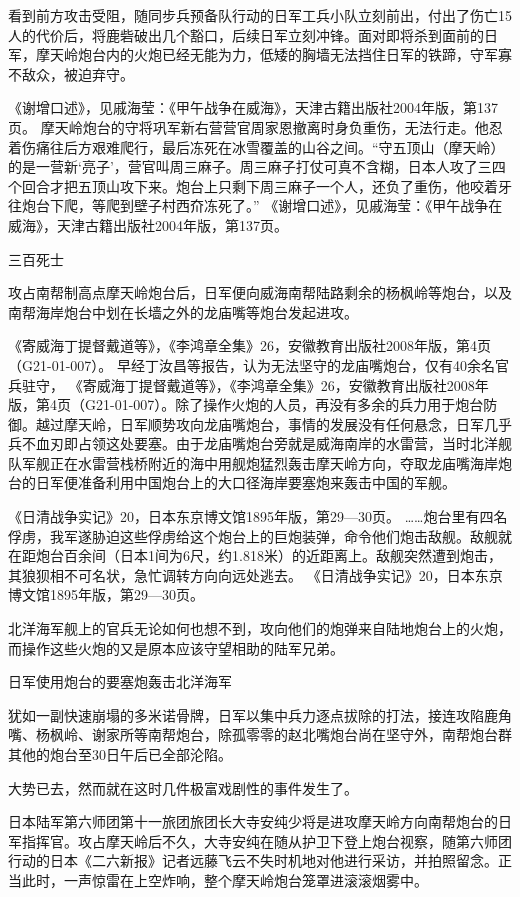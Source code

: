 \documentclass[12pt,UTF8]{ctexbook}
\begin{document}
看到前方攻击受阻，随同步兵预备队行动的日军工兵小队立刻前出，付出了伤亡15人的代价后，将鹿砦破出几个豁口，后续日军立刻冲锋。面对即将杀到面前的日军，摩天岭炮台内的火炮已经无能为力，低矮的胸墙无法挡住日军的铁蹄，守军寡不敌众，被迫弃守。

《谢增口述》，见戚海莹：《甲午战争在威海》，天津古籍出版社2004年版，第137页。
摩天岭炮台的守将巩军新右营营官周家恩撤离时身负重伤，无法行走。他忍着伤痛往后方艰难爬行，最后冻死在冰雪覆盖的山谷之间。“守五顶山（摩天岭）的是一营新‘亮子’，营官叫周三麻子。周三麻子打仗可真不含糊，日本人攻了三四个回合才把五顶山攻下来。炮台上只剩下周三麻子一个人，还负了重伤，他咬着牙往炮台下爬，等爬到壁子村西夼冻死了。” 《谢增口述》，见戚海莹：《甲午战争在威海》，天津古籍出版社2004年版，第137页。

三百死士

攻占南帮制高点摩天岭炮台后，日军便向威海南帮陆路剩余的杨枫岭等炮台，以及南帮海岸炮台中划在长墙之外的龙庙嘴等炮台发起进攻。

《寄威海丁提督戴道等》，《李鸿章全集》26，安徽教育出版社2008年版，第4页（G21-01-007）。
早经丁汝昌等报告，认为无法坚守的龙庙嘴炮台，仅有40余名官兵驻守， 《寄威海丁提督戴道等》，《李鸿章全集》26，安徽教育出版社2008年版，第4页（G21-01-007）。除了操作火炮的人员，再没有多余的兵力用于炮台防御。越过摩天岭，日军顺势攻向龙庙嘴炮台，事情的发展没有任何悬念，日军几乎兵不血刃即占领这处要塞。由于龙庙嘴炮台旁就是威海南岸的水雷营，当时北洋舰队军舰正在水雷营栈桥附近的海中用舰炮猛烈轰击摩天岭方向，夺取龙庙嘴海岸炮台的日军便准备利用中国炮台上的大口径海岸要塞炮来轰击中国的军舰。

《日清战争实记》20，日本东京博文馆1895年版，第29—30页。
……炮台里有四名俘虏，我军遂胁迫这些俘虏给这个炮台上的巨炮装弹，命令他们炮击敌舰。敌舰就在距炮台百余间（日本1间为6尺，约1.818米）的近距离上。敌舰突然遭到炮击，其狼狈相不可名状，急忙调转方向向远处逃去。 《日清战争实记》20，日本东京博文馆1895年版，第29—30页。

北洋海军舰上的官兵无论如何也想不到，攻向他们的炮弹来自陆地炮台上的火炮，而操作这些火炮的又是原本应该守望相助的陆军兄弟。


日军使用炮台的要塞炮轰击北洋海军

犹如一副快速崩塌的多米诺骨牌，日军以集中兵力逐点拔除的打法，接连攻陷鹿角嘴、杨枫岭、谢家所等南帮炮台，除孤零零的赵北嘴炮台尚在坚守外，南帮炮台群其他的炮台至30日午后已全部沦陷。

大势已去，然而就在这时几件极富戏剧性的事件发生了。

日本陆军第六师团第十一旅团旅团长大寺安纯少将是进攻摩天岭方向南帮炮台的日军指挥官。攻占摩天岭后不久，大寺安纯在随从护卫下登上炮台视察，随第六师团行动的日本《二六新报》记者远藤飞云不失时机地对他进行采访，并拍照留念。正当此时，一声惊雷在上空炸响，整个摩天岭炮台笼罩进滚滚烟雾中。
\end{document}
